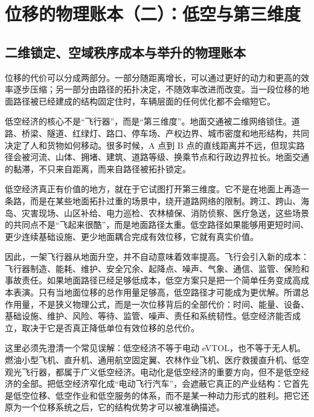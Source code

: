 \section{位移的物理账本（二）：低空与第三维度}

\subsection{二维锁定、空域秩序成本与举升的物理账本}

位移的代价可以分成两部分。一部分随距离增长，可以通过更好的动力和更高的效率逐步压缩；另一部分由路径的拓扑决定，不随效率改进而改变。当一段位移的地面路径被已经建成的结构固定住时，车辆层面的任何优化都不会缩短它。


低空经济的核心不是“飞行器”，而是“第三维度”。地面交通被二维网络锁住。道路、桥梁、隧道、红绿灯、路口、停车场、产权边界、城市密度和地形结构，共同决定了人和货物如何移动。很多时候，A 点到 B 点的直线距离并不远，但现实路径会被河流、山体、拥堵、建筑、道路等级、换乘节点和行政边界拉长。地面交通的黏滞，不只来自距离，而来自路径被拓扑锁定。

低空经济真正有价值的地方，就在于它试图打开第三维度。它不是在地面上再造一条路，而是在某些地面拓扑过重的场景中，绕开道路网络的限制。跨江、跨山、海岛、灾害现场、山区补给、电力巡检、农林植保、消防侦察、医疗急送，这些场景的共同点不是“飞起来很酷”，而是地面路径太重。低空路径如果能够用更短时间、更少连续基础设施、更少地面耦合完成有效位移，它就有真实价值。

因此，一架飞行器从地面升空，并不自动意味着效率提高。飞行会引入新的成本：飞行器制造、能耗、维护、安全冗余、起降点、噪声、气象、通信、监管、保险和事故责任。如果地面路径已经足够低成本，低空方案只是把一个简单任务变成高成本表演。只有当地面位移的总作用量足够高，低空路径才可能成为更优解。所谓总作用量，不是狭义物理公式，而是一次位移背后的全部代价：时间、能量、设备、基础设施、维护、风险、等待、监管、噪声、责任和系统韧性。低空经济能否成立，取决于它是否真正降低单位有效位移的总代价。

这里必须先澄清一个常见误解：低空经济不等于电动 eVTOL，也不等于无人机。燃油小型飞机、直升机、通用航空固定翼、农林作业飞机、医疗救援直升机、低空观光飞行器，都属于广义低空经济。电动化是低空经济的重要方向，但不是低空经济的全部。把低空经济窄化成“电动飞行汽车”，会遮蔽它真正的产业结构：它首先是低空位移、低空作业和低空服务的体系，而不是某一种动力形式的胜利。把它还原为一个位移系统之后，它的结构优势才可以被准确描述。

